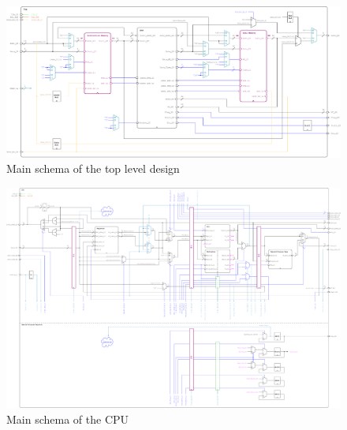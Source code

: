 \begin{landscape}
\begin{figure}[t!]

\centering
\includegraphics[scale=0.8]{figures/top.pdf}
\caption{Main schema of the top level design}
\label{fig:top_schema}
\end{figure}
\end{landscape}
\cleardoublepage
\begin{landscape}
\begin{figure}[t!]

\centering
\includegraphics[scale=0.35]{figures/cpu.pdf}
\caption{Main schema of the CPU}
\label{fig:cpu_schema}
\end{figure}
\end{landscape}

